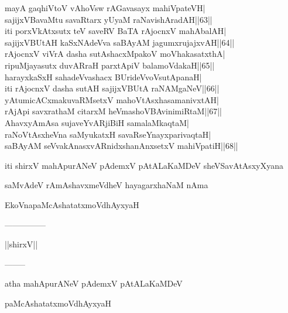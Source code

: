\documentclass{article}
\begin{document}
mayA gaqhiVtoV vAhoVsw rAGavasayx mahiVpateVH|\\
sajijxVBavaMtu savaRtarx yUyaM raNavishAradAH||63||\\
iti porxVkAtxsutx teV saveRV BaTA rAjocnxV mahAbalAH|\\
sajijxVBUtAH kaSxNAdeVva saBAyAM jagumxrujajxvAH||64||\\
rAjocnxV viVrA dasha sutAshacxMpakoV moVhakasatxthA|\\
ripuMjayasutx duvARraH parxtApiV balamoVdakaH||65||\\
harayxkaSxH sahadeVvashacx BUrideVvoVsutApanaH|\\
iti rAjocnxV dasha sutAH sajijxVBUtA raNAMgaNeV||66||\\
yAtumicACxmakuvaRMsetxV mahoVtAsxhasamanivxtAH|\\
rAjApi savxrathaM citarxM heVmashoVBAvinimiRtaM||67||\\
AhavxyAmAsa sujaveYvARjiBiH samalaMkaqtaM|\\
raNoVtAsxheVna saMyukatxH savaRseYnayxparivaqtaH|\\
saBAyAM seVvakAnasxvARnidxshanAnxsetxV mahiVpatiH||68||

\begin{center}
iti shirxV mahApurANeV pAdemxV pAtALaKaMDeV sheVSavAtAsxyXyana
\end{center}

\begin{center}
saMvAdeV rAmAshavxmeVdheV hayagarxhaNaM nAma
\end{center}

\begin{center}
EkoVnapaMcAshatatxmoVdhAyxyaH
\end{center}

\begin{center}
---------------
\end{center}

\begin{center}
||shirxV||
\end{center}

\begin{center}
--------
\end{center}

\begin{center}
atha mahApurANeV pAdemxV pAtALaKaMDeV
\end{center}

\begin{center}
paMcAshatatxmoVdhAyxyaH
\end{center}
\end{document}
